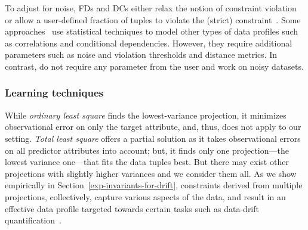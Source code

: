  To adjust for noise, FDs and DCs either relax the notion of
constraint violation or allow a user-defined fraction of tuples to violate the
(strict) constraint~\cite{pena2019discovery, huhtala1999tane,
kruse2018efficient, DBLP:conf/sigmod/IlyasMHBA04, koudas2009metric,
caruccio2016discovery, DBLP:journals/corr/abs-2005-08540}. Some
approaches~\cite{DBLP:conf/sigmod/IlyasMHBA04, DBLP:conf/sigmod/ZhangGR20,
DBLP:conf/sigmod/YanSZWC20} use statistical techniques to model other types of
data profiles such as correlations and conditional dependencies. However, they
require additional parameters such as noise and violation thresholds and
distance metrics. In contrast, \dis do not require any parameter from the user
and work on noisy datasets.

 \label{nocandidate}

\subsubsection*{Learning techniques} While \emph{ordinary least square} finds
the lowest-variance projection, it minimizes observational error on only the
target attribute, and, thus, does not apply to our setting. \emph{Total least
square} offers a partial solution as it takes observational errors on all
predictor attributes into account; but, it finds only one projection---the
lowest variance one---that fits the data tuples best. But there may exist other
projections with slightly higher variances and we consider them all. As we show
empirically in Section~\ref{exp-invariants-for-drift}, constraints derived from
multiple projections, collectively, capture various aspects of the data, and
result in an effective data profile targeted towards certain tasks such as
data-drift quantification~\citeTechRep.

\medskip 

